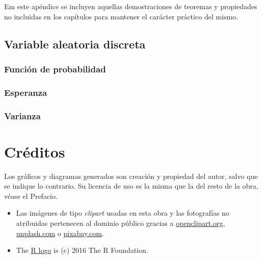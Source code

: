\documentclass[
]{book}
\begin{document}
Em este apéndice se incluyen aquellas demostraciones de teoremas y propiedades
no incluidas en los capítulos para mantener el carácter práctico del mismo.

\hypertarget{variable-aleatoria-discreta}{%
\section{Variable aleatoria discreta}\label{variable-aleatoria-discreta}}

\hypertarget{funciuxf3n-de-probabilidad}{%
\subsection{Función de probabilidad}\label{funciuxf3n-de-probabilidad}}

\hypertarget{esperanza}{%
\subsection{Esperanza}\label{esperanza}}

\hypertarget{varianza}{%
\subsection{Varianza}\label{varianza}}

\hypertarget{creditos}{%
\chapter{Créditos}\label{creditos}}

Los gráficos y diagramas generados son creación y propiedad del autor, salvo que se
indique lo contrario. Su licencia de uso es la misma que la del resto de la
obra, véase el Prefacio.

\begin{itemize}
\item
  Las imágenes de tipo \emph{clipart} usadas en esta obra y las fotografías no atribuidas
  pertenecen al dominio público gracias a \href{http://www.openclipart.org}{openclipart.org}, \href{https://unsplash.com}{unplash.com} o \href{https://pixabay.com/es/}{pixabay.com}.
\item
  The \href{https://www.r-project.org/logo/}{R logo} is (c) 2016 The R Foundation.
\end{itemize}

  
\end{document}
